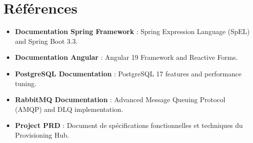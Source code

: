 \chapter*{Références}

\begin{itemize}
    \item \textbf{Documentation Spring Framework} : Spring Expression Language (SpEL) and Spring Boot 3.3.
    \item \textbf{Documentation Angular} : Angular 19 Framework and Reactive Forms.
    \item \textbf{PostgreSQL Documentation} : PostgreSQL 17 features and performance tuning.
    \item \textbf{RabbitMQ Documentation} : Advanced Message Queuing Protocol (AMQP) and DLQ implementation.
    \item \textbf{Project PRD} : Document de spécifications fonctionnelles et techniques du Provisioning Hub.
\end{itemize}
